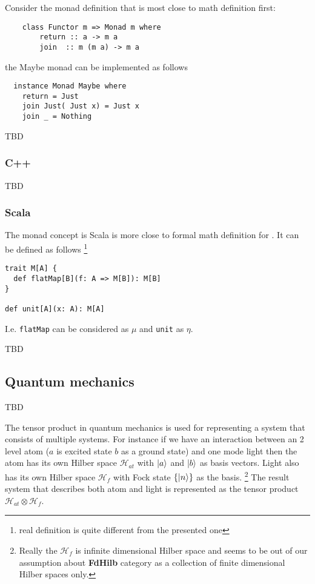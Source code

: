 \begin{example}
\label{ex:maybe_monad_haskell}
Consider the monad definition that is most close to math definition
first:
\begin{verbatim}
    class Functor m => Monad m where
        return :: a -> m a
        join  :: m (m a) -> m a
\end{verbatim} 
the Maybe monad can be implemented as follows
\begin{verbatim}
  instance Monad Maybe where
    return = Just
    join Just( Just x) = Just x
    join _ = Nothing
\end{verbatim} 

\end{example}
TBD

\subsubsection{C++}

TBD

\subsubsection{Scala}

\begin{example}
The monad concept is Scala is more close to formal math definition for
. It can be defined as follows 
\footnote{real definition is quite different from the presented one}
\label{ex:monad_scala}
\begin{verbatim}
trait M[A] {
  def flatMap[B](f: A => M[B]): M[B]
}
  
def unit[A](x: A): M[A]
\end{verbatim} 
I.e. \texttt{flatMap} can be considered as $\mu$ and
\texttt{unit} as $\eta$. 
\end{example}

TBD

\subsection{Quantum mechanics}

\begin{definition}
  \label{def:tensor_product}
  TBD
\end{definition}

The tensor product in quantum mechanics is used for
representing a system that consists of multiple systems. For instance
if we have an interaction between an 2 level atom ($a$ is excited
state $b$ as a ground state) and one mode light then the
atom has its own Hilber space $\mathcal{H}_{at}$ with $\ket{a}$ and
$\ket{b}$ as basis 
vectors.  Light also has its own Hilber space $\mathcal{H}_f$ with Fock state
$\{\ket{n}\}$ as the basis.
\footnote{
  Really the $\mathcal{H}_f$ is infinite dimensional Hilber space and
  seems to be out of our assumption about \textbf{FdHilb} category as
  a collection of finite dimensional Hilber spaces only.
}
The result system that describes both atom
and light is represented as the tensor product $\mathcal{H}_{at}
\otimes \mathcal{H}_f$.

